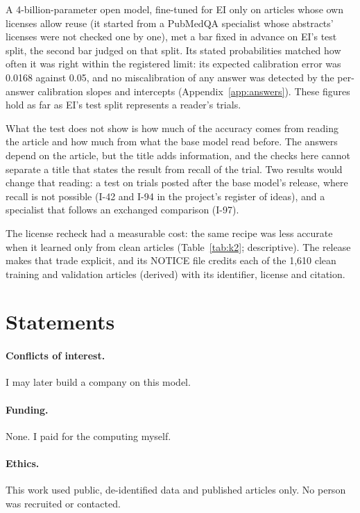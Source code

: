 \documentclass[11pt,letterpaper]{article}
\begin{document}
A 4-billion-parameter open model, fine-tuned for EI only on articles whose own licenses allow reuse (it started from a PubMedQA specialist whose abstracts' licenses were not checked one by one), met a bar fixed in advance on EI's test split, the second bar judged on that split. Its stated probabilities matched how often it was right within the registered limit: its expected calibration error was 0.0168 against 0.05, and no miscalibration of any answer was detected by the per-answer calibration slopes and intercepts (Appendix~\ref{app:answers}). These figures hold as far as EI's test split represents a reader's trials.

What the test does not show is how much of the accuracy comes from reading the article and how much from what the base model read before. The answers depend on the article, but the title adds information, and the checks here cannot separate a title that states the result from recall of the trial. Two results would change that reading: a test on trials posted after the base model's release, where recall is not possible (I-42 and I-94 in the project's register of ideas), and a specialist that follows an exchanged comparison (I-97).

The license recheck had a measurable cost: the same recipe was less accurate when it learned only from clean articles (Table~\ref{tab:k2}; descriptive). The release makes that trade explicit, and its NOTICE file credits each of the 1,610 clean training and validation articles (derived) with its identifier, license and citation.

\section*{Statements}
\label{sec:statements}

\paragraph{Conflicts of interest.} I may later build a company on this model.

\paragraph{Funding.} None. I paid for the computing myself.

\paragraph{Ethics.} This work used public, de-identified data and published articles only. No person was recruited or contacted.
\end{document}
